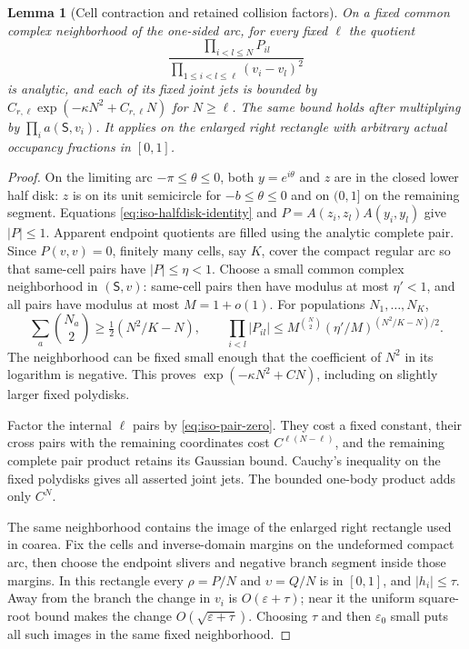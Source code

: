 \documentclass[11pt]{article}
\numberwithin{equation}{section}
\newtheorem{lemma}[theorem]{Lemma}
\theoremstyle{definition}
\newcommand{\eps}{\varepsilon}
\begin{document}
\begin{lemma}[Cell contraction and retained collision factors]
\label{lem:iso-cell-gaussian}
On a fixed common complex neighborhood of the one-sided arc, for
every fixed $\ell$ the quotient
\[
 \frac{\prod_{i<l\le N}P_{il}}
      {\prod_{1\le i<l\le\ell}(v_i-v_l)^2}
\]
is analytic, and each of its fixed joint jets is bounded by
$C_{r,\ell}\exp(-\kappa N^2+C_{r,\ell}N)$ for $N\ge\ell$.
The same bound holds after multiplying by $\prod_i a(\mathsf S,v_i)$.
It applies on the enlarged right rectangle with arbitrary actual
occupancy fractions in $[0,1]$.
\end{lemma}
\begin{proof}
On the limiting arc $-\pi\le\theta\le0$, both $y=e^{i\theta}$ and
$z$ are in the closed lower half disk: $z$ is on its unit semicircle
for $-b\le\theta\le0$ and on $(0,1]$ on the remaining segment.
Equations \eqref{eq:iso-halfdisk-identity} and $P=A(z_i,z_l)A(y_i,y_l)$
give $|P|\le1$.  Apparent endpoint quotients are filled using the
analytic complete pair.  Since $P(v,v)=0$, finitely many cells,
say $K$, cover the compact regular arc so that same-cell pairs have
$|P|\le\eta<1$.  Choose a small common complex neighborhood in
$(\mathsf S,v)$: same-cell pairs then have modulus at most
$\eta'<1$, and all pairs have modulus at most $M=1+o(1)$.
For populations $N_1,\ldots,N_K$,
\[
 \sum_a\binom{N_a}{2}\ge\tfrac12(N^2/K-N),\qquad
 \prod_{i<l}|P_{il}|
 \le M^{\binom N2}(\eta'/M)^{(N^2/K-N)/2}.
\]
The neighborhood can be fixed small enough that the coefficient of
$N^2$ in its logarithm is negative.  This proves
$\exp(-\kappa N^2+CN)$, including on slightly larger fixed polydisks.

Factor the internal $\ell$ pairs by \eqref{eq:iso-pair-zero}.
They cost a fixed constant, their cross pairs with the remaining
coordinates cost $C^{\ell(N-\ell)}$, and the remaining complete
pair product retains its Gaussian bound.  Cauchy's inequality on the
fixed polydisks gives all asserted joint jets.  The bounded one-body
product adds only $C^N$.

The same neighborhood contains the image of the enlarged right
rectangle used in coarea. Fix the cells and inverse-domain margins
on the undeformed compact arc, then choose the endpoint slivers and
negative branch segment inside those margins. In this rectangle every
$\rho=P/N$ and $\upsilon=Q/N$ is in $[0,1]$, and
$|h_i|\le\tau$.  Away from the branch the change in $v_i$ is
$O(\eps+\tau)$; near it the uniform square-root bound makes the
change $O(\sqrt{\eps+\tau})$.  Choosing $\tau$ and then $\eps_0$
small puts all such images in the same fixed neighborhood.
\end{proof}
\end{document}
